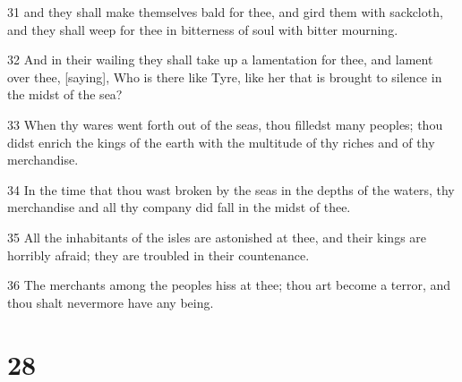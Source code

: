 \par 31 and they shall make themselves bald for thee, and gird them with sackcloth, and they shall weep for thee in bitterness of soul with bitter mourning.
\par 32 And in their wailing they shall take up a lamentation for thee, and lament over thee, [saying], Who is there like Tyre, like her that is brought to silence in the midst of the sea?
\par 33 When thy wares went forth out of the seas, thou filledst many peoples; thou didst enrich the kings of the earth with the multitude of thy riches and of thy merchandise.
\par 34 In the time that thou wast broken by the seas in the depths of the waters, thy merchandise and all thy company did fall in the midst of thee.
\par 35 All the inhabitants of the isles are astonished at thee, and their kings are horribly afraid; they are troubled in their countenance.
\par 36 The merchants among the peoples hiss at thee; thou art become a terror, and thou shalt nevermore have any being.

\chapter{28}

